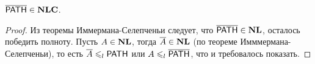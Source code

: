 \begin{statement} $\overline{\mathsf{PATH}} \in \textbf{NLC}$. \end{statement} 

\begin{proof} Из теоремы Иммермана-Селепченьи следует, что $\overline{\mathsf{PATH}} \in \textbf{NL}$, осталось победить полноту. Пусть $A \in \textbf{NL}$, тогда $\overline{A} \in \textbf{NL}$ (по теореме Имммермана-Селепченьи), то есть $\overline{A} \leqslant_l \mathsf{PATH}$ или $A \leqslant_l \overline{\mathsf{PATH}}$, что и требовалось показать. \end{proof}